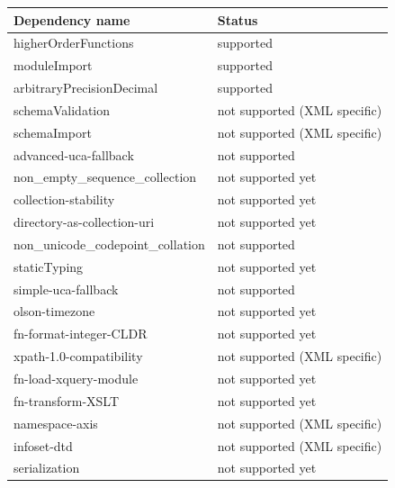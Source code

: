 \begin{table}
	\centering
	\begin{tabular}{|l|l|} 
		\hline
		\textbf{Dependency name}           & \textbf{Status}               \\ 
		\hline
		higherOrderFunctions               & supported                     \\ 
		\hline
		moduleImport                       & supported                     \\ 
		\hline
		arbitraryPrecisionDecimal          & supported                     \\ 
		\hline
		schemaValidation                   & not supported (XML specific)  \\ 
		\hline
		schemaImport                       & not supported (XML specific)  \\ 
		\hline
		advanced-uca-fallback              & not supported                 \\ 
		\hline
		non\_empty\_sequence\_collection   & not supported yet             \\ 
		\hline
		collection-stability               & not supported yet             \\ 
		\hline
		directory-as-collection-uri        & not supported yet             \\ 
		\hline
		non\_unicode\_codepoint\_collation & not supported                 \\ 
		\hline
		staticTyping                       & not supported yet             \\ 
		\hline
		simple-uca-fallback                & not supported                 \\ 
		\hline
		olson-timezone                     & not supported yet             \\ 
		\hline
		fn-format-integer-CLDR             & not supported yet             \\ 
		\hline
		xpath-1.0-compatibility            & not supported (XML specific)  \\ 
		\hline
		fn-load-xquery-module              & not supported yet             \\ 
		\hline
		fn-transform-XSLT                  & not supported yet             \\ 
		\hline
		namespace-axis                     & not supported (XML specific)  \\ 
		\hline
		infoset-dtd                        & not supported (XML specific)  \\ 
		\hline
		serialization                      & not supported yet             \\ 

\end{tabular}
\end{table}
